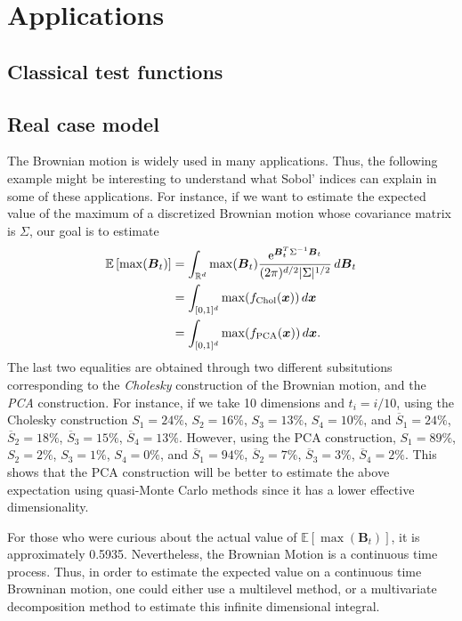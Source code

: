 \documentclass[]{elsarticle}
\theoremstyle{definition}
\newcommand{\bvec}[1]{\boldsymbol{#1}}
\newcommand{\vx}{\bvec{x}}
\begin{document}
\section{Applications}
\label{appli}
\subsection{Classical test functions}
\subsection{Real case model}
The Brownian motion is widely used in many applications. Thus, the following example might be interesting to understand what Sobol' indices can explain in some of these applications. For instance, if we want to estimate the expected value of the maximum of a discretized Brownian motion whose covariance matrix is $\Sigma$, our goal is to estimate
\begin{align*}
\mathbb{E} \left[\max(\bvec{B}_t)\right] &= \int_{\mathbb{R}^d} \max(\bvec{B}_t) \frac{{\rm e}^{\bvec{B}_t^T\Sigma^{-1}\bvec{B}_t}}{(2\pi)^{d/2}|\Sigma|^{1/2}}\,d\bvec{B}_t \\
&= \int_{[0,1]^d} \max(f_{\rm Chol}(\vx)) \,d\vx \\
&= \int_{[0,1]^d} \max(f_{\rm PCA}(\vx)) \,d\vx.
\end{align*}
The last two equalities are obtained through two different subsitutions corresponding to the \textit{Cholesky} construction of the Brownian motion, and the \textit{PCA} construction. For instance, if we take 10 dimensions and $t_i=i/10$, using the Cholesky construction $S_{1} = 24\%$, $S_{2} = 16\%$, $S_{3} = 13\%$, $S_{4} = 10\%$, and $\overline{S}_{1}=24\%$, $\overline{S}_{2}=18\%$, $\overline{S}_{3}=15\%$, $\overline{S}_{4} = 13\%$. However, using the PCA construction, $S_{1} = 89\%$, $S_{2} = 2\%$, $S_{3} = 1\%$, $S_{4} = 0\%$, and $\overline{S}_{1}=94\%$, $\overline{S}_{2}=7\%$, $\overline{S}_{3}=3\%$, $\overline{S}_{4} = 2\%$. This shows that the PCA construction will be better to estimate the above expectation using quasi-Monte Carlo methods since it has a lower effective dimensionality.

For those who were curious about the actual value of $\mathbb{E} \left[\max(\bvec{B}_t)\right]$, it is approximately 0.5935. Nevertheless, the Brownian Motion is a continuous time process. Thus, in order to estimate the expected value on a continuous time Browninan motion, one could either use a multilevel method, or a multivariate decomposition method to estimate this infinite dimensional integral.
\end{document}
